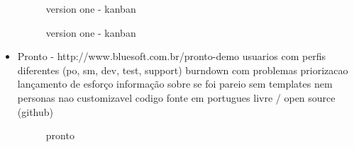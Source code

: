 \begin{itemize}
\begin{figure}[htbp]
  \centering
  \caption{version one - kanban}
\end{figure}

\begin{figure}[htbp]
  \centering
  \caption{version one - kanban}
\end{figure}

\item Pronto - http://www.bluesoft.com.br/pronto-demo
usuarios com perfis diferentes (po, sm, dev, test, support)
burndown com problemas
priorizacao
lançamento de esforço
informação sobre se foi pareio
sem templates nem personas
nao customizavel
codigo fonte em portugues
livre / open source (github)

\begin{figure}[htbp]
  \centering
  \caption{pronto}
\end{figure}


\end{itemize}
